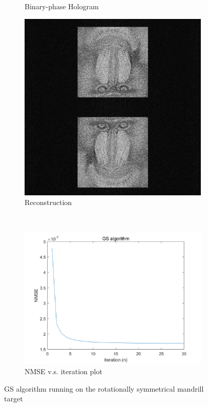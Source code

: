 \begin{figure}[H]
\begin{subfigure}[t]{0.3\textwidth}
    \caption{Binary-phase Hologram}
    \label{fig:GS_Holo_mandrill_2}
  \end{subfigure}
  \hfill
  \begin{subfigure}[t]{0.3\textwidth}
    \centering
    \includegraphics[width=\textwidth]{GS_Recon_mandrill_2.jpg}
    \caption{Reconstruction}
    \label{fig:GS_Recon_mandrill_2}
  \end{subfigure}
  \\
  \begin{subfigure}[t]{0.7\textwidth}
    \centering
    \includegraphics[width=\textwidth]{GS_mandrill_2_convergence.png}
    \caption{NMSE v.s. iteration plot}
    \label{fig:GS_mandrill_2_convergence}
  \end{subfigure}
  \caption{GS algorithm running on the rotationally symmetrical mandrill target}
  \label{fig:GS algorithm running on the rotationally symmetrical mandrill target}
\end{figure}

